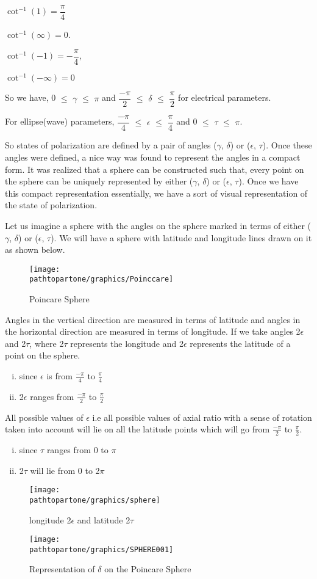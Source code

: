 $\cot^{-1}(1)= \dfrac{\pi}{4}$

$\cot^{-1}(\infty)= 0$.

$\cot^{-1}(-1) = -\dfrac{\pi}{4}$, 

$\cot^{-1}(-\infty) = 0$

So we have,  0 $\leq$ $\gamma$ $\leq$ $\pi$  and $\dfrac{-\pi}{2}$ $\leq$ $\delta$ $\leq$ $\dfrac{\pi}{2}$ for electrical parameters.

For ellipse(wave) parameters, $\dfrac{-\pi}{4}$ $\leq$ $\epsilon$ $\leq$ $\dfrac{\pi}{4}$ and 0 $\leq$ $\tau$ $\leq$ $\pi$.

So states of polarization are defined by a pair of angles ($\gamma$, $\delta$) or ($\epsilon$, $\tau$). Once these angles were defined, a nice way was found to represent the angles in a compact form. It was realized that a sphere can be constructed such that, every point on the sphere can be uniquely represented by either ($\gamma$, $\delta$) or ($\epsilon$, $\tau$). Once we have this compact representation essentially, we have a sort of visual representation of the state of polarization. 

Let us imagine a sphere with the angles on the sphere marked in terms of either ($\gamma$, $\delta$) or ($\epsilon$, $\tau$). We will have a sphere with latitude and longitude lines drawn on it as shown below.
\begin{figure}[h]
\centering
\texttt{[image: \\pathtopartone/graphics/Poinccare]}
\caption{Poincare Sphere}
\label{fig:poinccare}
\end{figure}

Angles in the vertical direction are measured in terms of latitude and angles in the horizontal direction are measured in terms of longitude. If we take angles 2$\epsilon$ and 2$\tau$, where 2$\tau$ represents the longitude and 2$\epsilon$ represents the latitude of a point on the sphere.
\begin{enumerate}[(i)]
\item	since $\epsilon$ is from $\frac{-\pi}{4}$ to $\frac{\pi}{4}$
\item 	2$\epsilon$ ranges from $\frac{-\pi}{2}$ to $\frac{\pi}{2}$
\end{enumerate}
All possible values of $\epsilon$ i.e all possible values of axial ratio with a sense of rotation taken into account will lie on all the latitude points which will go from $\frac{-\pi}{2}$ to $\frac{\pi}{2}$. 
\begin{enumerate}[(i)]
\item 	since $\tau$ ranges from 0 to $\pi$
\item 	2$\tau$ will lie from 0 to 2$\pi$
\end{enumerate}
\begin{figure}[h]
\centering
\texttt{[image: \\pathtopartone/graphics/sphere]}
\caption{longitude 2$\epsilon$ and latitude 2$\tau$}
\end{figure}
\begin{figure}[h]
\centering
\texttt{[image: \\pathtopartone/graphics/SPHERE001]}
\caption{Representation of $\delta$ on the Poincare Sphere}
\label{fig:sphere001}
\end{figure}

